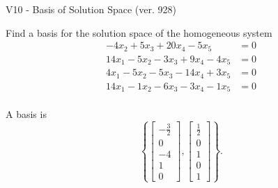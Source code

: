 \begin{exercise}
  \begin{exerciseTitle}V10 - Basis of Solution Space (ver. 928)\end{exerciseTitle}
  \begin{exerciseStatement}
    Find a basis for the solution space of the homogeneous system 
\begin{align*}
 -4 x_ 2 + 5 x_ 3 + 20 x_ 4 -5 x_ 5 &= 0  \\ 
  14 x_ 1 -5 x_ 2 -3 x_ 3 + 9 x_ 4 -4 x_ 5 &= 0  \\ 
  4 x_ 1 -5 x_ 2 -5 x_ 3 -14 x_ 4 + 3 x_ 5 &= 0  \\ 
  14 x_ 1 -1 x_ 2 -6 x_ 3 -3 x_ 4 -1 x_ 5 &= 0  \\ 
 \end{align*}


 
  \end{exerciseStatement}

  \begin{exerciseAnswer}
   A basis is   
\[\left\{\left[\begin{array}{c}
-\frac{3}{2} \\
0 \\
-4 \\
1 \\
0
\end{array}\right] , \left[\begin{array}{c}
\frac{1}{2} \\
0 \\
1 \\
0 \\
1
\end{array}\right]\right\}.\]

  


  \end{exerciseAnswer}
\end{exercise}